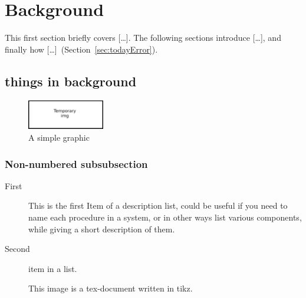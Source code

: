 \section{Background}
\label{sec:background}

This first section briefly covers [\dots]. The following sections introduce [\dots], and finally how [\dots]~(Section~\ref{sec:todayError}).

\subsection{things in background}
\label{sec:thing1}


\lipsum[1]


\begin{figure}[h]
	\centering
	\includegraphics[width=0.3\textwidth]{resources/temp.png}
	\caption{A simple graphic}
	\label{fig:simple}	
\end{figure}


\subsubsection*{Non-numbered subsubsection}


\begin{description}
	\item [First] This is the first Item of a description list, could be useful if you need to name each procedure in a system, or in other ways list various components, while giving a short description of them.

	\item [Second] item in a list.
	

\end{description}

\lipsum[5]

\pagebreak


\begin{figure}[htb]
	\centering
	\resizebox{\textwidth}{!}{}
	\caption{This image is a tex-document written in tikz.}
	\label{fig:tikz}
\end{figure}

\lipsum[2-4]

\pagebreak